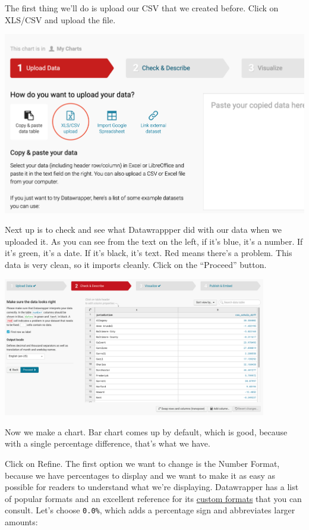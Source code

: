 \documentclass[
  letterpaper,
  DIV=11,
  numbers=noendperiod]{scrreprt}
\begin{document}
The first thing we'll do is upload our CSV that we created before. Click
on XLS/CSV and upload the file.

\includegraphics[width=6.75in,height=\textheight]{./images/datawrapper2.png}

Next up is to check and see what Datawrappper did with our data when we
uploaded it. As you can see from the text on the left, if it's blue,
it's a number. If it's green, it's a date. If it's black, it's text. Red
means there's a problem. This data is very clean, so it imports cleanly.
Click on the ``Proceed'' button.

\includegraphics[width=4.53in,height=\textheight]{./images/datawrapper3.png}

Now we make a chart. Bar chart comes up by default, which is good,
because with a single percentage difference, that's what we have.

Click on Refine. The first option we want to change is the Number
Format, because we have percentages to display and we want to make it as
easy as possible for readers to understand what we're displaying.
Datawrapper has a list of popular formats and an excellent reference for
its
\href{https://academy.datawrapper.de/article/207-custom-number-formats-that-you-can-display-in-datawrapper}{custom
formats} that you can consult. Let's choose \texttt{0.0\%}, which adds a
percentage sign and abbreviates larger amounts:
\end{document}
